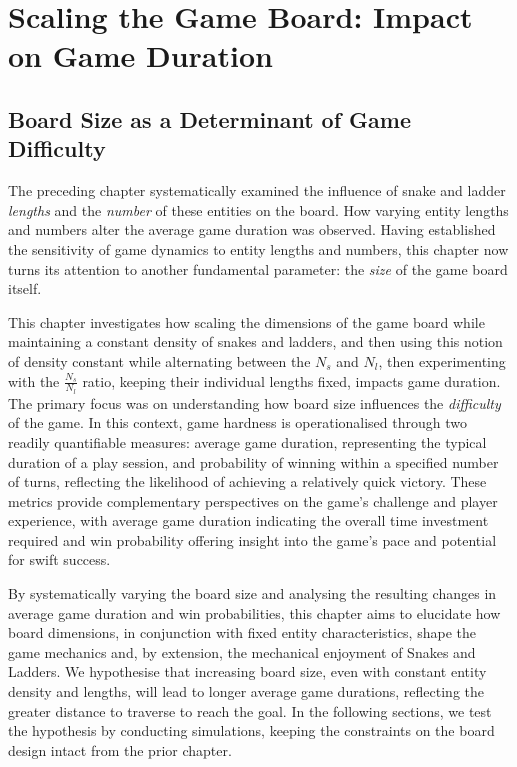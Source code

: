 \chapter{Scaling the Game Board: Impact on Game Duration}

\section{Board Size as a Determinant of Game Difficulty}

The preceding chapter systematically examined the influence of snake and ladder \textit{lengths} and the \textit{number} of these entities on the board. How varying entity lengths and numbers alter the average game duration was observed. Having established the sensitivity of game dynamics to entity lengths and numbers, this chapter now turns its attention to another fundamental parameter: the \textit{size} of the game board itself.

This chapter investigates how scaling the dimensions of the game board while maintaining a constant density of snakes and ladders, and then using this notion of density constant while alternating between the $N_s$  and $N_l$, then experimenting with the $\frac{N_s}{N_l}$ ratio, keeping their individual lengths fixed, impacts game duration. The primary focus was on understanding how board size influences the \textit{difficulty} of the game. In this context, game hardness is operationalised through two readily quantifiable measures: average game duration, representing the typical duration of a play session, and probability of winning within a specified number of turns, reflecting the likelihood of achieving a relatively quick victory. These metrics provide complementary perspectives on the game's challenge and player experience, with average game duration indicating the overall time investment required and win probability offering insight into the game's pace and potential for swift success.

By systematically varying the board size and analysing the resulting changes in average game duration and win probabilities, this chapter aims to elucidate how board dimensions, in conjunction with fixed entity characteristics, shape the game mechanics and, by extension, the mechanical enjoyment of Snakes and Ladders. We hypothesise that increasing board size, even with constant entity density and lengths, will lead to longer average game durations, reflecting the greater distance to traverse to reach the goal. In the following sections, we test the hypothesis by conducting simulations, keeping the constraints on the board design intact from the prior chapter.


